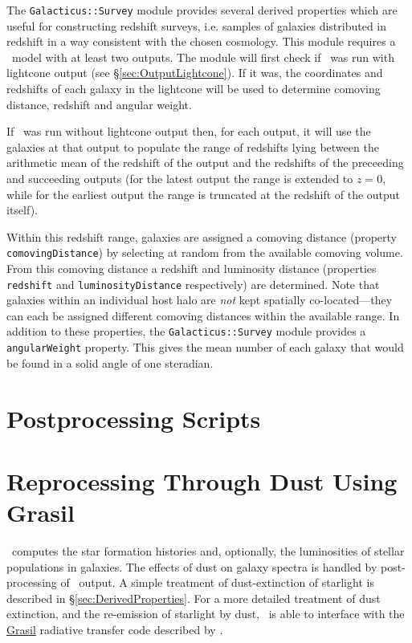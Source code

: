 The {\tt Galacticus::Survey} module provides several derived properties which are useful for constructing redshift surveys, i.e. samples of galaxies distributed in redshift in a way consistent with the chosen cosmology. This module requires a \glc\ model with at least two outputs. The module will first check if \glc\ was run with lightcone output (see \S\ref{sec:OutputLightcone}). If it was, the coordinates and redshifts of each galaxy in the lightcone will be used to determine comoving distance, redshift and angular weight.

If \glc\ was run without lightcone output then, for each output, it will use the galaxies at that output to populate the range of redshifts lying between the arithmetic mean of the redshift of the output and the redshifts of the preceeding and succeeding outputs (for the latest output the range is extended to $z=0$, while for the earliest output the range is truncated at the redshift of the output itself).

Within this redshift range, galaxies are assigned a comoving distance (property {\tt comovingDistance}) by selecting at random from the available comoving volume. From this comoving distance a redshift and luminosity distance (properties {\tt redshift} and {\tt luminosityDistance} respectively) are determined. Note that galaxies within an individual host halo are \emph{not} kept spatially co-located---they can each be assigned different comoving distances within the available range. In addition to these properties, the {\tt Galacticus::Survey} module provides a {\tt angularWeight} property. This gives the mean number of each galaxy that would be found in a solid angle of one steradian.

\section{Postprocessing Scripts}\label{sec:PostProcessingScripts}

\section{Reprocessing Through Dust Using {\sc Grasil}}\label{sec:Grasil}

\glc\ computes the star formation histories and, optionally, the luminosities of stellar populations in galaxies. The effects of dust on galaxy spectra is handled by post-processing of \glc\ output. A simple treatment of dust-extinction of starlight is described in \S\ref{sec:DerivedProperties}. For a more detailed treatment of dust extinction, and the re-emission of starlight by dust, \glc\ is able to interface with the \href{http://adlibitum.oat.ts.astro.it/silva/grasil/grasil.html}{{\sc Grasil}} radiative transfer code described by \cite{silva_modeling_1998}.

